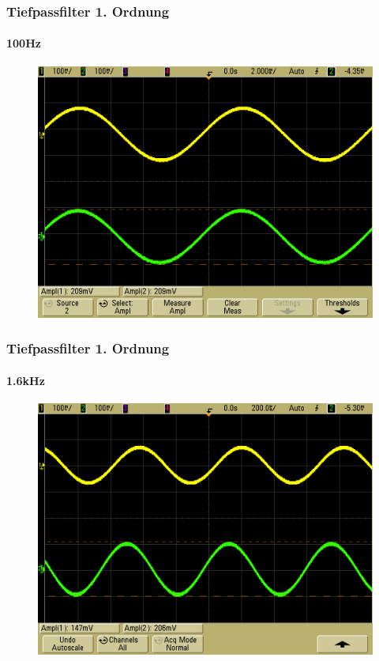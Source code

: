 \begin{frame}
    \frametitle{Tiefpassfilter 1. Ordnung}
    \framesubtitle{100Hz}
     \begin{figure}[H]
     \begin{center}
             \includegraphics[scale=0.2]{./img/2a_Tief_100Hz.png}
     \end{center}
     \end{figure}
\end{frame}
\begin{frame}
    \frametitle{Tiefpassfilter 1. Ordnung}
    \framesubtitle{1.6kHz}
     \begin{figure}[H]
     \begin{center}
             \includegraphics[scale=0.2]{./img/2a_Tief_1_6_kHz.png}
     \end{center}
     \end{figure}
\end{frame}
